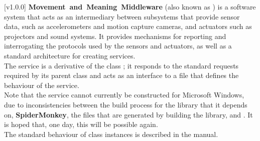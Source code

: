 [v1.0.0]
\textbf{Movement~and~Meaning~Middleware} (also known as \mplusm{}) is a software system
that acts as an intermediary between subsystems that provide sensor data, such as
accelerometers and motion capture cameras, and actuators such as projectors and sound
systems.
It provides mechanisms for reporting and interrogating the protocols used by the sensors
and actuators, as well as a standard architecture for creating services.\\

The \CLIO{} service is a derivative of the \mplusm{} class
;
it responds to the standard requests required by its parent class and acts as an interface
to a \CL{} file that defines the behaviour of the service.\\

Note that the \CLIO{} service cannot currently be constructed for Microsoft Windows, due
to inconsistencies between the build process for the library that it depends on,
\textbf{SpiderMonkey}, the files that are generated by building the library, and
.
It is hoped that, one day, this will be possible again.\\

The standard behaviour of  class instances is described
in the \emph{\MMM} manual.
\primaryEnd{}
